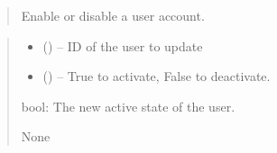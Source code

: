 \documentclass[a4paper,11pt,spanish]{sphinxmanual}
\begin{document}
\begin{fulllineitems}
\label{\detokenize{api/users/users.services:users.services.set_user_single_role}}
\pysigstartsignatures
\pysiglinewithargsret
{}
{\sphinxparamcomma {}\sphinxparamcomma {}}
{}
\pysigstopsignatures\begin{quote}

\sphinxAtStartPar
Enable or disable a user account.
\end{quote}
\begin{quote}\begin{description}
\begin{itemize}
\item {} 
\sphinxAtStartPar
{} () – ID of the user to update

\item {} 
\sphinxAtStartPar
{} () – True to activate, False to deactivate.

\end{itemize}

\sphinxAtStartPar
bool: The new active state of the user.

\sphinxAtStartPar
None

\end{description}\end{quote}

\end{fulllineitems}

\end{document}
